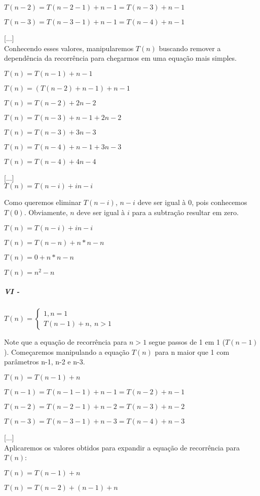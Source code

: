 \documentclass[a4paper, twocolumn]{article}
\theoremstyle{definition}
\begin{document}
$T(n-2) = T(n-2-1) + n - 1 = T(n-3) + n - 1$

$T(n-3) = T(n-3-1) + n - 1 = T(n-4) + n - 1$

[...] \\

Conhecendo esses valores, manipularemos $T(n)$ buscando remover a dependência da recorrência para chegarmos em uma equação mais simples.

$T(n) = T(n-1) + n - 1$

$T(n) = (T(n-2) + n - 1) + n - 1$

$T(n) = T(n-2) + 2n - 2$

$T(n) = T(n-3) + n - 1 + 2n - 2$ 

$T(n) = T(n-3) + 3n - 3$

$T(n) = T(n-4) + n - 1 + 3n - 3$ 

$T(n) = T(n-4) + 4n - 4$

[...] \\

$T(n) = T(n-i) + in - i$

Como queremos eliminar $T(n-i)$, $n-i$ deve ser igual à 0, pois conhecemos $T(0)$. Obviamente, $n$ deve ser igual à $i$ para a subtração resultar em zero.

$T(n) = T(n-i) + in - i$

$T(n) = T(n-n) + n*n - n$

$T(n) = 0 + n*n - n$

$T(n) = n^2 - n$


\subparagraph{VI - } {$T(n) = \begin{cases} 
		1, n  = 1\\
		T(n-1) + n, \ n > 1
	\end{cases}$}

Note que a equação de recorrência para $n>1$ segue passos de 1 em 1 ($T(n-1)$). Começaremos manipulando a equação $T(n)$ para n maior que 1 com parâmetros n-1, n-2 e n-3.

$T(n) = T(n-1) + n$

$T(n-1) = T(n-1-1) + n-1 = T(n-2) + n-1$

$T(n-2) = T(n-2-1) + n-2 = T(n-3) + n-2$

$T(n-3) = T(n-3-1) + n-3 = T(n-4) + n-3$

[...] \\

Aplicaremos os valores obtidos para expandir a equação de recorrência para $T(n)$:

$T(n) = T(n-1) + n$

$T(n) =  T(n-2) + (n-1) + n$
\end{document}

